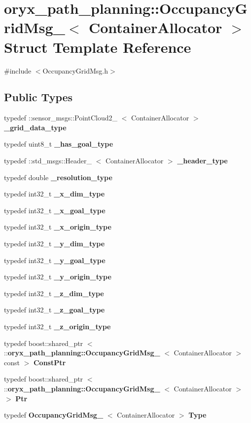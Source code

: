 \section{oryx\-\_\-path\-\_\-planning\-:\-:\-Occupancy\-Grid\-Msg\-\_\-$<$ \-Container\-Allocator $>$ \-Struct \-Template \-Reference}
\label{structoryx__path__planning_1_1OccupancyGridMsg__}


{\ttfamily \#include $<$\-Occupancy\-Grid\-Msg.\-h$>$}

\subsection*{\-Public \-Types}
\begin{DoxyCompactItemize}
\item 
typedef \*
\-::sensor\-\_\-msgs\-::\-Point\-Cloud2\-\_\-\*
$<$ \-Container\-Allocator $>$ {\bf \-\_\-grid\-\_\-data\-\_\-type}
\item 
typedef uint8\-\_\-t {\bf \-\_\-has\-\_\-goal\-\_\-type}
\item 
typedef \-::std\-\_\-msgs\-::\-Header\-\_\-\*
$<$ \-Container\-Allocator $>$ {\bf \-\_\-header\-\_\-type}
\item 
typedef double {\bf \-\_\-resolution\-\_\-type}
\item 
typedef int32\-\_\-t {\bf \-\_\-x\-\_\-dim\-\_\-type}
\item 
typedef int32\-\_\-t {\bf \-\_\-x\-\_\-goal\-\_\-type}
\item 
typedef int32\-\_\-t {\bf \-\_\-x\-\_\-origin\-\_\-type}
\item 
typedef int32\-\_\-t {\bf \-\_\-y\-\_\-dim\-\_\-type}
\item 
typedef int32\-\_\-t {\bf \-\_\-y\-\_\-goal\-\_\-type}
\item 
typedef int32\-\_\-t {\bf \-\_\-y\-\_\-origin\-\_\-type}
\item 
typedef int32\-\_\-t {\bf \-\_\-z\-\_\-dim\-\_\-type}
\item 
typedef int32\-\_\-t {\bf \-\_\-z\-\_\-goal\-\_\-type}
\item 
typedef int32\-\_\-t {\bf \-\_\-z\-\_\-origin\-\_\-type}
\item 
typedef boost\-::shared\-\_\-ptr\*
$<$ \-::{\bf oryx\-\_\-path\-\_\-planning\-::\-Occupancy\-Grid\-Msg\-\_\-}\*
$<$ \-Container\-Allocator $>$ const  $>$ {\bf \-Const\-Ptr}
\item 
typedef boost\-::shared\-\_\-ptr\*
$<$ \-::{\bf oryx\-\_\-path\-\_\-planning\-::\-Occupancy\-Grid\-Msg\-\_\-}\*
$<$ \-Container\-Allocator $>$ $>$ {\bf \-Ptr}
\item 
typedef {\bf \-Occupancy\-Grid\-Msg\-\_\-}\*
$<$ \-Container\-Allocator $>$ {\bf \-Type}
\end{DoxyCompactItemize}
